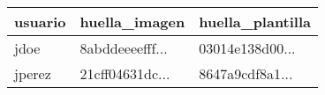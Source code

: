 \begin{tabular}{|C{3cm}|C{3cm}|C{3cm}|}
  \hline
  usuario & huella\_imagen & huella\_plantilla \\
  \hline
  jdoe & 8abddeeeefff... & 03014e138d00... \\
  \hline
  jperez & 21cff04631dc... & 8647a9cdf8a1... \\
  \hline
\end{tabular}
